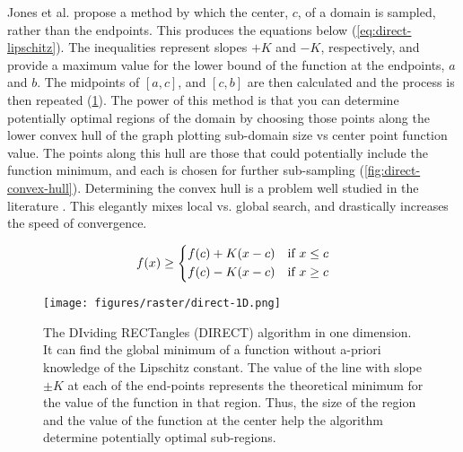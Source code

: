 Jones et al. \cite{jonesLipschitzianOptimizationLipschitz1993} propose a method by which the center, $c$, of a domain is sampled, rather than the endpoints. This produces the equations below (\cref{eq:direct-lipschitz}). The inequalities represent slopes $+K$ and $-K$, respectively, and provide a maximum value for the lower bound of the function at the endpoints, $a$ and $b$. The midpoints of $[a,c]$, and $[c,b]$ are then calculated and the process is then repeated (\cref{fig:direct-1D}). The power of this method is that you can determine potentially optimal regions of the domain by choosing those points along the lower convex hull of the graph plotting sub-domain size vs center point function value. The points along this hull are those that could potentially include the function minimum, and each is chosen for further sub-sampling (\cref{fig:direct-convex-hull}). Determining the convex hull is a problem well studied in the literature \cite{barberQuickhullAlgorithmConvex1996,chanOptimalOutputsensitiveConvex1996,jarvisIdentificationConvexHull1973,grahamEfficientAlgorithDetermining1972}. This elegantly mixes local vs. global search, and drastically increases the speed of convergence.


\begin{equation}
    f(x) \ge \begin{dcases}
        f(c) + K(x-c) & \text{if  } x \le c \\
        f(c) - K(x-c) & \text{if  } x \ge c
    \end{dcases}
    \label{eq:direct-lipschitz}
\end{equation}

\begin{figure}[h!]
    \begin{center}
        \texttt{[image: figures/raster/direct-1D.png]}
    \end{center}
    \caption[The DIviding RECTangles (DIRECT) algorithm in one dimension]{The DIviding RECTangles (DIRECT) algorithm in one dimension. It can find the global minimum of a function without a-priori knowledge of the Lipschitz constant. The value of the line with slope $\pm K$ at each of the end-points represents the theoretical minimum for the value of the function in that region. Thus, the size of the region and the value of the function at the center help the algorithm determine potentially optimal sub-regions.}
    \label{fig:direct-1D}
\end{figure}


